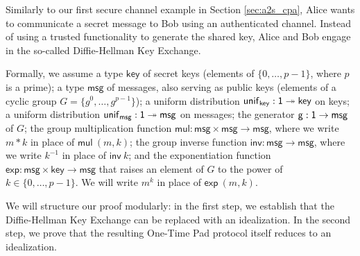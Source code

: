 \renewcommand{\key}{\mathsf{key}}
\renewcommand{\msg}{\mathsf{msg}}
\renewcommand{\unif}{\mathsf{unif}}
\newcommand{\ident}{\mathsf{ident}}
\newcommand{\gen}{\mathsf{g}}
\newcommand{\mul}{\mathsf{mul}}
\newcommand{\inv}{\mathsf{inv}}
\renewcommand{\exp}{\mathsf{exp}}
\renewcommand{\id}{\mathsf{id}}
\renewcommand{\adv}{\mathsf{adv}}
\renewcommand{\net}{\mathsf{net}}
\newcommand{\Alice}{\mathsf{Alice}}
\newcommand{\Bob}{\mathsf{Bob}}
\newcommand{\dhke}{\mathsf{DHKE}}
\newcommand{\otp}{\mathsf{OTP}}
\renewcommand{\In}{\mathsf{In}}
\renewcommand{\Out}{\mathsf{Out}}
\renewcommand{\Key}{\mathsf{Key}}
\renewcommand{\Send}{\mathsf{Send}}
\renewcommand{\Recv}{\mathsf{Recv}}
\renewcommand{\LeakMsgRcvd}{\mathsf{LeakMsgRcvd}}
\renewcommand{\OkMsg}{\mathsf{OkMsg}}
\newcommand{\OkKey}{\mathsf{OkKey}}
\renewcommand{\LeakCtxt}{\mathsf{LeakCtxt}}
\renewcommand{\OkCtxt}{\mathsf{OkCtxt}}
\newcommand{\SecretKey}{\mathsf{SecretKey}}
\newcommand{\PublicKey}{\mathsf{PublicKey}}
\newcommand{\LeakPublicKey}{\mathsf{LeakPublicKey}}
\newcommand{\OkPublicKey}{\mathsf{OkPublicKey}}

Similarly to our first secure channel example in Section \ref{sec:a2s_cpa}, Alice wants to communicate a secret message to Bob using an authenticated channel. Instead of using a trusted functionality to generate the shared key, Alice and Bob engage in the so-called Diffie-Hellman Key Exchange.

Formally, we assume a type $\key$ of secret keys (elements of $\{0,\ldots,p-1\}$, where $p$ is a prime); a type $\msg$ of messages, also serving as public keys (elements of a cyclic group $G = \{g^0,\ldots,g^{p-1}\}$); a uniform distribution $\unif_\key : \one \twoheadrightarrow \key$ on keys; a uniform distribution $\unif_\msg : \one \twoheadrightarrow \msg$ on messages; the generator $\gen : \one \rightarrow \msg$ of $G$; the group multiplication function $\mul : \msg \times \msg \rightarrow \msg$, where we write $m * k$ in place of $\mul \ (m,k)$; the group inverse function $\inv : \msg \rightarrow \msg$, where we write $k^{-1}$ in place of $\inv \ k$; and the exponentiation function $\exp : \msg \times \key \rightarrow \msg$ that raises an element of $G$ to the power of $k \in \{0,\ldots,p-1\}$. We will write $m^k$ in place of $\exp \ (m,k)$.

We will structure our proof modularly: in the first step, we establish that the Diffie-Hellman Key Exchange can be replaced with an idealization. In the second step, we prove that the resulting One-Time Pad protocol itself reduces to an idealization.

